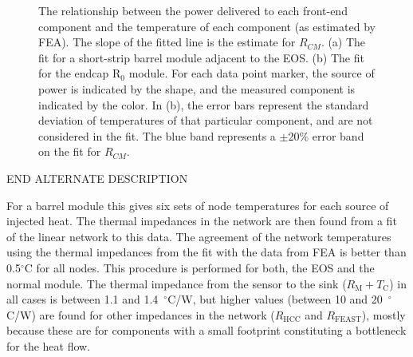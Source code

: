 \begin{figure}[ht]
\centering
{}
\caption{The relationship between the power delivered to each front-end component and the temperature
of each component (as estimated by FEA). The slope of the fitted line is the estimate for $R_{CM}$.
(a) The fit for a short-strip barrel module adjacent to the EOS. (b) The fit for the endcap R$_0$ module.
For each data point marker, the source of power is indicated by the shape, and the measured component is indicated
by the color.
In (b), the error bars represent the standard deviation of temperatures of
that particular component, and are not considered in the fit.
The blue band represents a $\pm$20\% error band on the fit for $R_{CM}$.
}
\label{fig:solving_for_Rcm}
\end{figure}

END ALTERNATE DESCRIPTION

For a barrel module this gives six sets of node temperatures for each source of injected heat. The thermal impedances in the network are then found from a fit of the linear network to this data. The agreement of the network temperatures using the thermal impedances from the fit with the data from FEA is better than 0.5$^\circ$C for all nodes. This procedure is performed for both, the EOS and the normal module. The thermal impedance from the sensor to the sink ($R_\text{M}+T_\text{C}$) in all cases is between 1.1 and 1.4~$^\circ$C/W, but higher values (between 10 and 20~$^\circ$C/W) are found for other impedances in the network ($R_\text{HCC}$ and $R_\text{FEAST}$), mostly because these are for components with a small footprint constituting a bottleneck for the heat flow.

